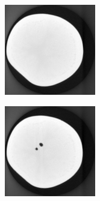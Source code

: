 \documentclass[journal]{IEEEtran}
\begin{document}
\begin{figure}[!h]
    \begin{subfigure}[b]{0.24\linewidth}
        \includegraphics[width=\textwidth]{../images/potato/template_1.png}
 \caption{}
    \end{subfigure}
    \begin{subfigure}[b]{0.24\linewidth}
        \includegraphics[width=\textwidth]{../images/potato/template_2.png}

\end{subfigure}
\end{figure}
\end{document}
